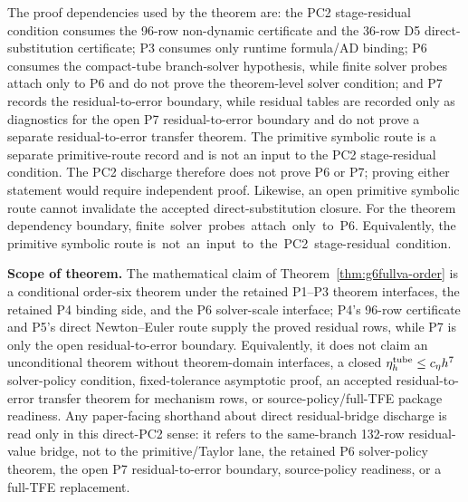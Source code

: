\documentclass[preprint,12pt]{elsarticle}
\newcommand{\tfe}{TFE}
\begin{document}
The proof dependencies used by the theorem are:
the PC2 stage-residual condition consumes the 96-row non-dynamic certificate and the 36-row D5
direct-substitution certificate; P3 consumes only runtime formula/AD binding;
P6 consumes the compact-tube branch-solver hypothesis, while finite solver probes
attach only to P6 and do not prove the theorem-level solver condition; and P7
records the residual-to-error boundary, while residual tables
are recorded only as diagnostics for the open P7 residual-to-error boundary and do not prove a separate residual-to-error transfer
theorem. The primitive symbolic route is a separate primitive-route record and is
not an input to the PC2 stage-residual condition. The PC2 discharge therefore
does not prove P6 or P7; proving either statement would require independent
proof. Likewise, an open primitive symbolic route cannot
invalidate the accepted direct-substitution closure.
For the theorem dependency boundary, \mbox{finite solver probes attach only to P6}.
Equivalently, the primitive symbolic route \mbox{is not an input to the PC2
stage-residual condition}.

\noindent\textbf{Scope of theorem.}
The mathematical claim of
Theorem~\ref{thm:g6fullva-order} is a conditional order-six theorem under the
retained P1--P3 theorem interfaces, the retained P4 binding side, and the P6
solver-scale interface; P4's 96-row certificate and P5's direct
Newton--Euler route supply the proved residual rows, while P7 is only the
open residual-to-error boundary. Equivalently, it does not claim an unconditional
theorem without theorem-domain interfaces, a closed
\(\eta_h^{\rm tube}\le c_\eta h^7\) solver-policy condition,
fixed-tolerance asymptotic proof, an accepted residual-to-error transfer
theorem for mechanism rows, or source-policy/full-TFE package readiness.
Any paper-facing shorthand about direct residual-bridge discharge is read only
in this direct-PC2 sense: it refers to the same-branch 132-row residual-value
bridge, not to the primitive/Taylor lane, the retained P6 solver-policy
theorem, the open P7 residual-to-error boundary, source-policy readiness, or
a full-\tfe{} replacement.
\end{document}

